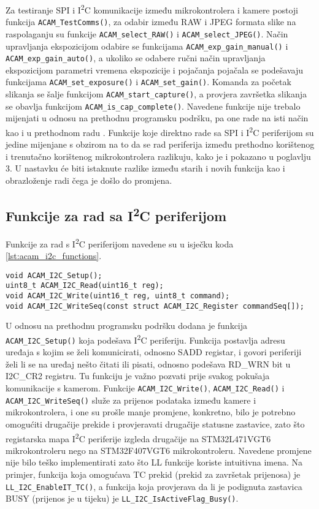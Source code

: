 \noindent Za testiranje SPI i I\textsuperscript{2}C komunikacije između mikrokontrolera i kamere postoji funkcija \verb|ACAM_TestComms()|, za odabir između RAW i JPEG formata slike na raspolaganju su funkcije \verb|ACAM_select_RAW()| i \verb|ACAM_select_JPEG()|. Način upravljanja ekspozicijom odabire se funkcijama \verb|ACAM_exp_gain_manual()| i \\ \verb|ACAM_exp_gain_auto()|, a ukoliko se odabere ručni način upravljanja ekspozicijom parametri vremena ekspozicije i pojačanja pojačala se podešavaju funkcijama \verb|ACAM_set_exposure()| i \verb|ACAM_set_gain()|. Komanda za početak slikanja se šalje funkcijom \verb|ACAM_start_capture()|, a provjera završetka slikanja se obavlja funkcijom \verb|ACAM_is_cap_complete()|. Navedene funkcije nije trebalo mijenjati u odnosu na prethodnu programsku podršku, pa one rade na isti način kao i u prethodnom radu \cite{diplomski_goran_petrak}. Funkcije koje direktno rade sa SPI i I\textsuperscript{2}C periferijom su jedine mijenjane s obzirom na to da se rad periferija između prethodno korištenog i trenutačno korištenog mikrokontrolera razlikuju, kako je i pokazano u poglavlju 3. U nastavku će biti istaknute razlike između starih i novih funkcija kao i obrazloženje radi čega je došlo do promjena.

\subsection{Funkcije za rad sa I\textsuperscript{2}C periferijom}

Funkcije za rad s I\textsuperscript{2}C periferijom navedene su u isječku koda \ref{lst:acam_i2c_functions}.

\begin{lstlisting}[caption=Funkcije za rad s I\textsuperscript{2}C periferijom, label={lst:acam_i2c_functions}]
void ACAM_I2C_Setup();
uint8_t ACAM_I2C_Read(uint16_t reg);
void ACAM_I2C_Write(uint16_t reg, uint8_t command);
void ACAM_I2C_WriteSeq(const struct ACAM_I2C_Register commandSeq[]);
\end{lstlisting}

\noindent U odnosu na prethodnu programsku podršku dodana je funkcija \verb|ACAM_I2C_Setup()| koja podešava I\textsuperscript{2}C periferiju. Funkcija postavlja adresu uređaja s kojim se želi komunicirati, odnosno SADD registar, i govori periferiji želi li se na uređaj nešto čitati ili pisati, odnosno podešava RD\_WRN bit u I2C\_CR2 registru. Tu funkciju je važno pozvati prije svakog pokušaja komunikacije s kamerom. Funkcije \verb|ACAM_I2C_Write()|,  \verb|ACAM_I2C_Read()| i \verb|ACAM_I2C_WriteSeq()| služe za prijenos podataka između kamere i mikrokontrolera, i one su prošle manje promjene, konkretno, bilo je potrebno omogućiti drugačije prekide i provjeravati drugačije statusne zastavice, zato što registarska mapa I\textsuperscript{2}C periferije izgleda drugačije na STM32L471VGT6 mikrokontroleru nego na STM32F407VGT6 mikrokontroleru. Navedene promjene nije bilo teško implementirati zato što LL funkcije koriste intuitivna imena. Na primjer, funkcija koja omogućava TC prekid (prekid za završetak prijenosa) je \verb|LL_I2C_EnableIT_TC()|, a funkcija koja provjerava da li je podignuta zastavica BUSY (prijenos je u tijeku) je \verb|LL_I2C_IsActiveFlag_Busy()|.

